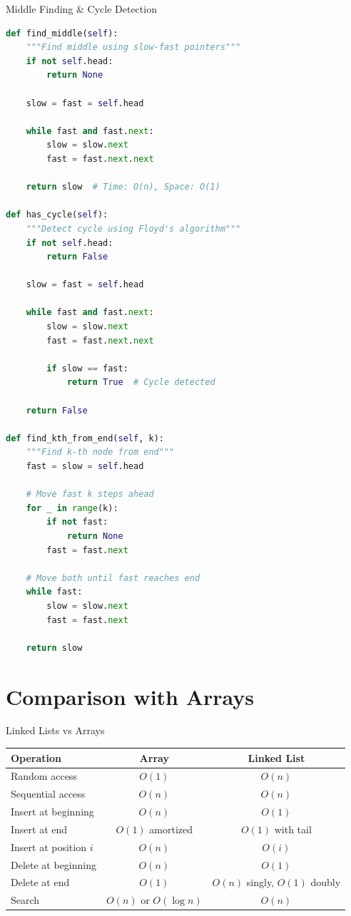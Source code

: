 \documentclass[aspectratio=169,xcolor=dvipsnames]{beamer}
\begin{document}
\begin{frame}[fragile]{Middle Finding \& Cycle Detection}
\begin{lstlisting}[language=Python, basicstyle=\tiny\ttfamily]
def find_middle(self):
    """Find middle using slow-fast pointers"""
    if not self.head:
        return None

    slow = fast = self.head

    while fast and fast.next:
        slow = slow.next
        fast = fast.next.next

    return slow  # Time: O(n), Space: O(1)

def has_cycle(self):
    """Detect cycle using Floyd's algorithm"""
    if not self.head:
        return False

    slow = fast = self.head

    while fast and fast.next:
        slow = slow.next
        fast = fast.next.next

        if slow == fast:
            return True  # Cycle detected

    return False

def find_kth_from_end(self, k):
    """Find k-th node from end"""
    fast = slow = self.head

    # Move fast k steps ahead
    for _ in range(k):
        if not fast:
            return None
        fast = fast.next

    # Move both until fast reaches end
    while fast:
        slow = slow.next
        fast = fast.next

    return slow
\end{lstlisting}
\end{frame}

\section{Comparison with Arrays}

\begin{frame}{Linked Lists vs Arrays}
  \begin{table}
    \centering
    \small
    \begin{tabular}{lcc}
      \hline
      \textbf{Operation} & \textbf{Array} & \textbf{Linked List} \\
      \hline
      Random access & $O(1)$ & $O(n)$ \\
      Sequential access & $O(n)$ & $O(n)$ \\
      Insert at beginning & $O(n)$ & $O(1)$ \\
      Insert at end & $O(1)$ amortized & $O(1)$ with tail \\
      Insert at position $i$ & $O(n)$ & $O(i)$ \\
      Delete at beginning & $O(n)$ & $O(1)$ \\
      Delete at end & $O(1)$ & $O(n)$ singly, $O(1)$ doubly \\
      Search & $O(n)$ or $O(\log n)$ & $O(n)$ \\
      \hline
    \end{tabular}
  \end{table}
\end{frame}
\end{document}
